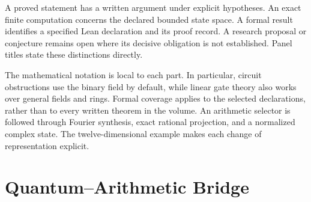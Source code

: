 A proved statement has a written argument under explicit hypotheses. An exact finite computation concerns the declared bounded state space. A formal result identifies a specified Lean declaration and its proof record. A research proposal or conjecture remains open where its decisive obligation is not established. Panel titles state these distinctions directly.

The mathematical notation is local to each part. In particular, circuit obstructions use the binary field by default, while linear gate theory also works over general fields and rings. Formal coverage applies to the selected declarations, rather than to every written theorem in the volume.
\tableofcontents
\mainmatter
{}
{An arithmetic selector is followed through Fourier synthesis, exact rational projection, and a normalized complex state. The twelve-dimensional example makes each change of representation explicit.}
{
}
\chapter{Quantum--Arithmetic Bridge}

